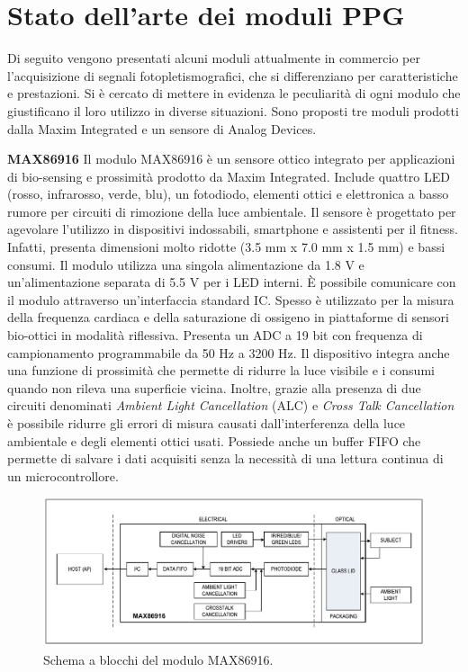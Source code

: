 \section{Stato dell'arte dei moduli PPG}
Di seguito vengono presentati alcuni moduli attualmente in commercio per l'acquisizione di segnali fotopletismografici, che si differenziano per caratteristiche e prestazioni. Si è cercato di mettere in evidenza le peculiarità di ogni modulo che giustificano il loro utilizzo in diverse situazioni. Sono proposti tre moduli prodotti dalla Maxim Integrated e un sensore di Analog Devices.

\textbf{MAX86916} Il modulo MAX86916 è un sensore ottico integrato per applicazioni di bio-sensing e prossimità prodotto da Maxim Integrated\cite{IntegratedMAX86916}. Include quattro LED (rosso, infrarosso, verde, blu), un fotodiodo, elementi ottici e elettronica a basso rumore per circuiti di rimozione della luce ambientale. Il sensore è progettato per agevolare l'utilizzo in dispositivi indossabili, smartphone e assistenti per il fitness. Infatti, presenta dimensioni molto ridotte (3.5 mm x 7.0 mm x 1.5 mm) e bassi consumi. Il modulo utilizza una singola alimentazione da 1.8 V e un'alimentazione separata di 5.5 V per i LED interni. \`E possibile comunicare con il modulo attraverso un'interfaccia standard IC. Spesso è utilizzato per la misura della frequenza cardiaca e della saturazione di ossigeno in piattaforme di sensori bio-ottici in modalità riflessiva. Presenta un ADC a 19 bit con frequenza di campionamento programmabile da 50 Hz a 3200 Hz. Il dispositivo integra anche una funzione di prossimità che permette di ridurre la luce visibile e i consumi quando non rileva una superficie vicina. Inoltre, grazie alla presenza di due circuiti denominati \textit{Ambient Light Cancellation} (ALC) e \textit{Cross Talk Cancellation} è possibile ridurre gli errori di misura causati dall'interferenza della luce ambientale e degli elementi ottici usati. Possiede anche un buffer FIFO che permette di salvare i dati acquisiti senza la necessità di una lettura continua di un microcontrollore.
\begin{figure}[h]
	\centering
	\includegraphics[width=1\linewidth]{ImageFiles/Fotopletismografia/MAX86916BlockDiagram}
	\caption{Schema a blocchi del modulo MAX86916.}
	\label{fig:MAX86916BlockDiagram}
\end{figure}

